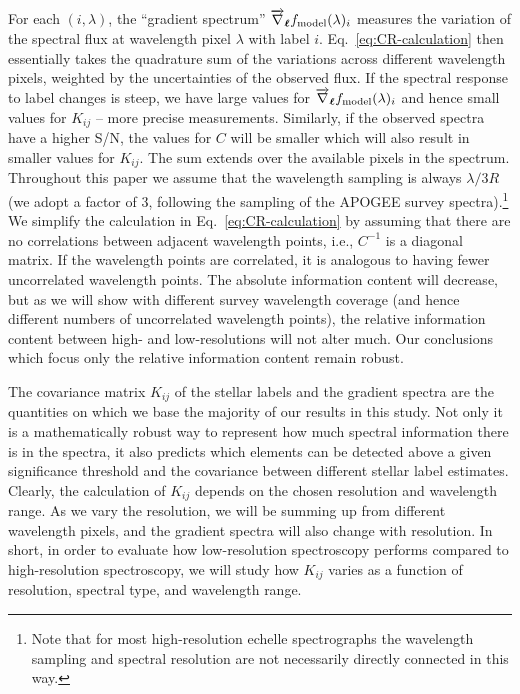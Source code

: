 \documentclass[iop]{emulateapj}
\newcommand{\set}[1]{\bm{#1}}
\newcommand{\starlabel}{\ell}
\newcommand{\labels}{\set{\starlabel}}
\begin{document}
\begin{CJK*}{UTF8}{gbsn}
\noindent
For each $(i,\lambda)$, the ``gradient spectrum'' $\overrightarrow{\nabla}_{\labels} f_{\rm model} (\lambda)_{i}$ measures the variation of the spectral flux at wavelength pixel $\lambda$ with label $i$. Eq.~\ref{eq:CR-calculation} then essentially takes the quadrature sum of the variations across different wavelength pixels, weighted by the uncertainties of the observed flux. If the spectral response to label changes is steep, we have large values for $\overrightarrow{\nabla}_{\labels} f_{\rm model} (\lambda)_{i}$ and hence small values for $K_{ij}$ -- more precise measurements. Similarly, if the observed spectra have a higher S/N, the values for $C$ will be smaller which will also result in smaller values for $K_{ij}$. The sum extends over the available pixels in the spectrum. Throughout this paper we assume that the wavelength sampling is always $\lambda/3R$ (we adopt a factor of 3, following the sampling of the APOGEE survey spectra).\footnote{Note that for most high-resolution echelle spectrographs the wavelength sampling and spectral resolution are not necessarily directly connected in this way.} We simplify the calculation in Eq.~\ref{eq:CR-calculation} by assuming that there are no correlations between adjacent wavelength points, i.e., $C^{-1}$ is a diagonal matrix. If the wavelength points are correlated, it is analogous to having fewer uncorrelated wavelength points. The absolute information content will decrease, but as we will show with different survey wavelength coverage (and hence different numbers of uncorrelated wavelength points), the relative information content between high- and low-resolutions will not alter much. Our conclusions which focus only the relative information content remain robust.

The covariance matrix $K_{ij}$ of the stellar labels and the gradient spectra are the quantities on which we base the majority of our results in this study. Not only it is a mathematically robust way to represent how much spectral information there is in the spectra, it also predicts which elements can be detected above a given significance threshold and the covariance between different stellar label estimates. Clearly, the calculation of $K_{ij}$ depends on the chosen resolution and wavelength range. As we vary the resolution, we will be summing up from different wavelength pixels, and the gradient spectra will also change with resolution. In short, in order to evaluate how low-resolution spectroscopy performs compared to high-resolution spectroscopy, we will study how $K_{ij}$ varies as a function of resolution, spectral type, and wavelength range.



\end{CJK*}
\end{document}

